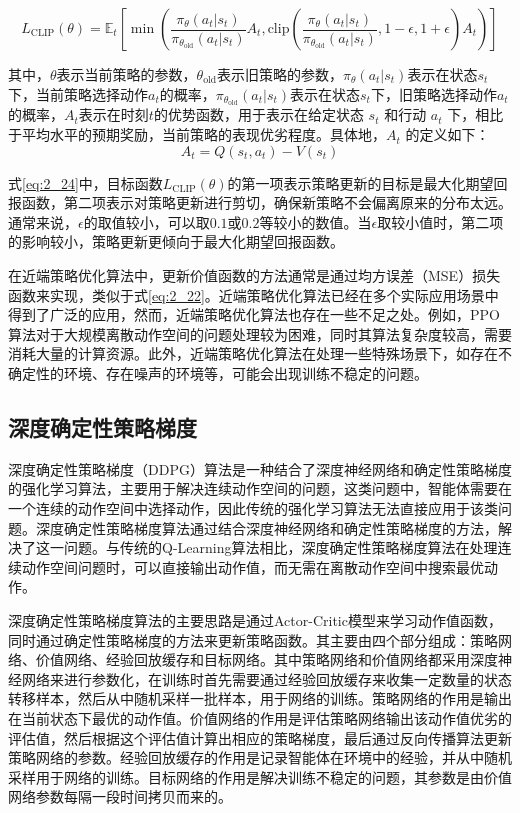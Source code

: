 \begin{equation}
\label{eq:2_24}
L_{\text{CLIP}}(\theta) = \mathbb{E}_t\left[\min\left(\frac{\pi_{\theta}(a_t|s_t)}{\pi_{\theta_{\text{old}}}(a_t|s_t)}A_t, \text{clip}\left(\frac{\pi_{\theta}(a_t|s_t)}{\pi_{\theta_{\text{old}}}(a_t|s_t)}, 1-\epsilon, 1+\epsilon\right)A_t\right)\right]
\end{equation}

其中，$\theta$表示当前策略的参数，$\theta_{\text{old}}$表示旧策略的参数，$\pi_{\theta}(a_t|s_t)$表示在状态$s_t$下，当前策略选择动作$a_t$的概率，$\pi_{\theta_{\text{old}}}(a_t|s_t)$表示在状态$s_t$下，旧策略选择动作$a_t$的概率，$A_t$表示在时刻$t$的优势函数，用于表示在给定状态 $s_t$ 和行动 $a_t$ 下，相比于平均水平的预期奖励，当前策略的表现优劣程度。具体地，$A_t$ 的定义如下：
\begin{equation}
\label{eq:2_25}
A_t = Q(s_t, a_t) - V(s_t)
\end{equation}

式\ref{eq:2_24}中，目标函数$L_{\text{CLIP}}(\theta)$的第一项表示策略更新的目标是最大化期望回报函数，第二项表示对策略更新进行剪切，确保新策略不会偏离原来的分布太远。通常来说，$\epsilon$的取值较小，可以取$0.1$或$0.2$等较小的数值。当$\epsilon$取较小值时，第二项的影响较小，策略更新更倾向于最大化期望回报函数。

在近端策略优化算法中，更新价值函数的方法通常是通过均方误差（MSE）损失函数来实现，类似于式\ref{eq:2_22}。近端策略优化算法已经在多个实际应用场景中得到了广泛的应用，然而，近端策略优化算法也存在一些不足之处。例如，PPO算法对于大规模离散动作空间的问题处理较为困难，同时其算法复杂度较高，需要消耗大量的计算资源。此外，近端策略优化算法在处理一些特殊场景下，如存在不确定性的环境、存在噪声的环境等，可能会出现训练不稳定的问题。


\subsection{深度确定性策略梯度}

深度确定性策略梯度（DDPG）算法是一种结合了深度神经网络和确定性策略梯度的强化学习算法，主要用于解决连续动作空间的问题，这类问题中，智能体需要在一个连续的动作空间中选择动作，因此传统的强化学习算法无法直接应用于该类问题。深度确定性策略梯度算法通过结合深度神经网络和确定性策略梯度的方法，解决了这一问题。与传统的Q-Learning算法相比，深度确定性策略梯度算法在处理连续动作空间问题时，可以直接输出动作值，而无需在离散动作空间中搜索最优动作。

深度确定性策略梯度算法的主要思路是通过Actor-Critic模型来学习动作值函数，同时通过确定性策略梯度的方法来更新策略函数。其主要由四个部分组成：策略网络、价值网络、经验回放缓存和目标网络。其中策略网络和价值网络都采用深度神经网络来进行参数化，在训练时首先需要通过经验回放缓存来收集一定数量的状态转移样本，然后从中随机采样一批样本，用于网络的训练。策略网络的作用是输出在当前状态下最优的动作值。价值网络的作用是评估策略网络输出该动作值优劣的评估值，然后根据这个评估值计算出相应的策略梯度，最后通过反向传播算法更新策略网络的参数。经验回放缓存的作用是记录智能体在环境中的经验，并从中随机采样用于网络的训练。目标网络的作用是解决训练不稳定的问题，其参数是由价值网络参数每隔一段时间拷贝而来的。


